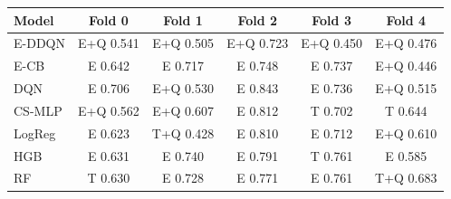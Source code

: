 \begin{tabular}{lccccc}
\toprule
Model & Fold 0 & Fold 1 & Fold 2 & Fold 3 & Fold 4 \\
\midrule
E-DDQN & E+Q 0.541 & E+Q 0.505 & E+Q 0.723 & E+Q 0.450 & E+Q 0.476 \\
E-CB & E 0.642 & E 0.717 & E 0.748 & E 0.737 & E+Q 0.446 \\
DQN & E 0.706 & E+Q 0.530 & E 0.843 & E 0.736 & E+Q 0.515 \\
CS-MLP & E+Q 0.562 & E+Q 0.607 & E 0.812 & T 0.702 & T 0.644 \\
LogReg & E 0.623 & T+Q 0.428 & E 0.810 & E 0.712 & E+Q 0.610 \\
HGB & E 0.631 & E 0.740 & E 0.791 & T 0.761 & E 0.585 \\
RF & T 0.630 & E 0.728 & E 0.771 & E 0.761 & T+Q 0.683 \\
\bottomrule
\end{tabular}
